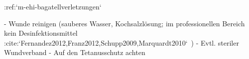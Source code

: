 :ref:`m-ehi-bagatellverletzungen`
\begin{itemize}
  -   Wunde reinigen (sauberes Wasser, Kochsalzlösung; im professionellen Bereich kein Desinfektionsmittel 
 :cite:`Fernandez2012,Franz2012,Schupp2009,Marquardt2010`\ )
  -   Evtl. steriler Wundverband
  -   Auf den Tetanusschutz achten
\end{itemize}